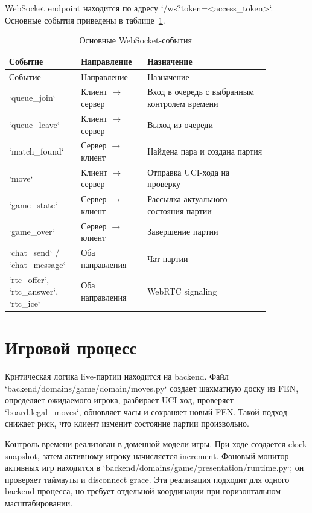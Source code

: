 \documentclass[14pt,a4paper]{extreport}
\begin{document}
WebSocket endpoint находится по адресу `/ws?token=<access_token>`. Основные события приведены в таблице~\ref{tab:ws}.

\begin{center}
\scriptsize
\setlength{\tabcolsep}{4pt}
\renewcommand{\arraystretch}{1.25}
\begin{longtable}{|>{\RaggedRight\arraybackslash}p{0.22\linewidth}|>{\RaggedRight\arraybackslash}p{0.22\linewidth}|>{\RaggedRight\arraybackslash}p{0.42\linewidth}|}
\caption{Основные WebSocket-события}\label{tab:ws}\\
\hline
Событие & Направление & Назначение\\ \hline
\endfirsthead
\hline
Событие & Направление & Назначение\\ \hline
\endhead
`queue\_join` & Клиент $\rightarrow$ сервер & Вход в очередь с выбранным контролем времени\\ \hline
`queue\_leave` & Клиент $\rightarrow$ сервер & Выход из очереди\\ \hline
`match\_found` & Сервер $\rightarrow$ клиент & Найдена пара и создана партия\\ \hline
`move` & Клиент $\rightarrow$ сервер & Отправка UCI-хода на проверку\\ \hline
`game\_state` & Сервер $\rightarrow$ клиент & Рассылка актуального состояния партии\\ \hline
`game\_over` & Сервер $\rightarrow$ клиент & Завершение партии\\ \hline
`chat\_send` / `chat\_message` & Оба направления & Чат партии\\ \hline
`rtc\_offer`, `rtc\_answer`, `rtc\_ice` & Оба направления & WebRTC signaling\\ \hline
\end{longtable}
\end{center}

\section{Игровой процесс}

Критическая логика live-партии находится на backend. Файл `backend/domains/game/domain/moves.py` создает шахматную доску из FEN, определяет ожидаемого игрока, разбирает UCI-ход, проверяет `board.legal_moves`, обновляет часы и сохраняет новый FEN. Такой подход снижает риск, что клиент изменит состояние партии произвольно.

Контроль времени реализован в доменной модели игры. При ходе создается clock snapshot, затем активному игроку начисляется increment. Фоновый монитор активных игр находится в `backend/domains/game/presentation/runtime.py`; он проверяет таймауты и disconnect grace. Эта реализация подходит для одного backend-процесса, но требует отдельной координации при горизонтальном масштабировании.
\end{document}
